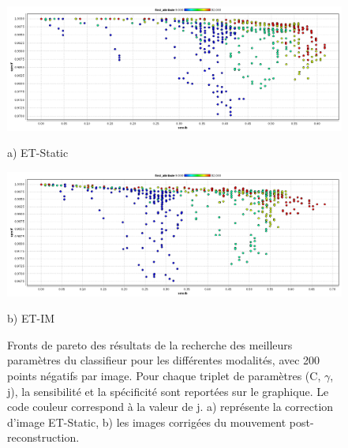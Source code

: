 \begin{figure}[h!]

\begin{center}
 \includegraphics[width=14cm]{images/pareto_mod_Static19.png}

{\small a) ET-Static}
\vspace{0.5cm}

 \includegraphics[width=14cm]{images/pareto_mod_IM19.png}

{\small b) ET-IM}

\end{center}
 \caption{Fronts de pareto des résultats de la recherche des meilleurs paramètres du classifieur pour les différentes modalités, avec 200 points négatifs par image. Pour chaque triplet de paramètres (C, $\gamma$, j), la sensibilité et la spécificité sont reportées sur le graphique. Le code couleur correspond à la valeur de j. a) représente la correction d'image ET-Static, b) les images corrigées du mouvement post-reconstruction.}
\label{fig:paretoModalite19_1}
\end{figure}

